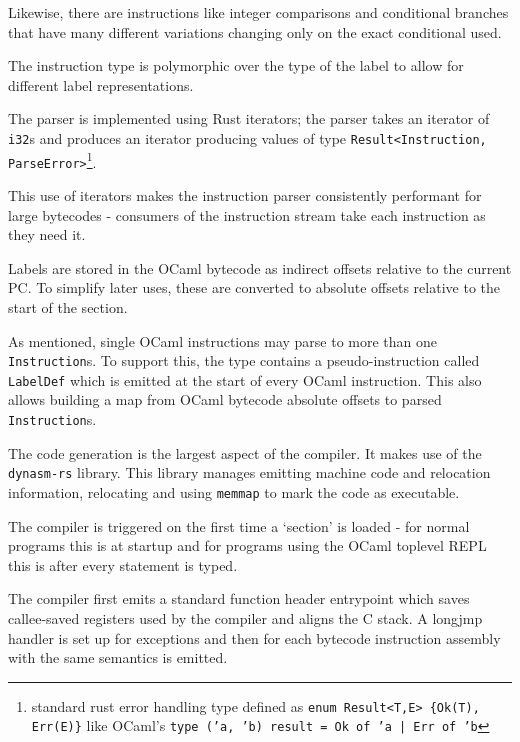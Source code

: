 Likewise, there are instructions like integer comparisons and conditional branches that have many
different variations changing only on the exact conditional used.

The instruction type is polymorphic over the type of the label to allow for different label
representations.


The parser is implemented using Rust iterators; the parser takes an iterator of \texttt{i32}s and
produces an iterator producing values of type \texttt{Result<Instruction,
      ParseError>}\footnote{standard rust error handling type defined as \texttt{enum Result<T,E>
            \{Ok(T), Err(E)\}} like OCaml's \texttt{type ('a, 'b) result = Ok of 'a | Err of 'b}}.

This use of iterators makes the instruction parser consistently performant for large bytecodes -
consumers of the instruction stream take each instruction as they need it.

Labels are stored in the OCaml bytecode as indirect offsets relative to the current PC. To simplify
later uses, these are converted to absolute offsets relative to the start of the section.

As mentioned, single OCaml instructions may parse to more than one \texttt{Instruction}s. To
support this, the type contains a pseudo-instruction called \texttt{LabelDef} which is emitted at
the start of every OCaml instruction. This also allows building a map from OCaml bytecode
absolute offsets to parsed \texttt{Instruction}s.


The code generation is the largest aspect of the compiler. It makes use of the \texttt{dynasm-rs}
library. This library manages emitting machine code and relocation information, relocating and
using \texttt{memmap} to mark the code as executable.

The compiler is triggered on the first time a `section' is loaded - for normal programs this is at
startup and for programs using the OCaml toplevel REPL this is after every statement is typed.

The compiler first emits a standard function header entrypoint which saves callee-saved registers
used by the compiler and aligns the C stack. A longjmp handler is set up for exceptions and then
for each bytecode instruction assembly with the same semantics is emitted.


